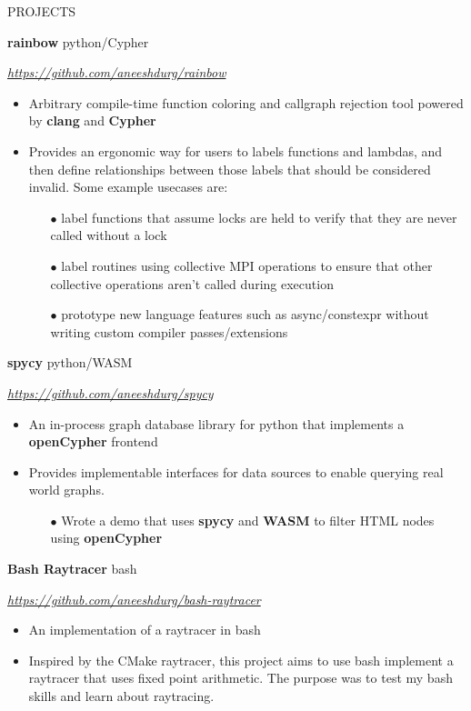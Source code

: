 \documentclass[paper=a4,fontsize=11pt]{scrartcl} %
\newcommand{\sepspace}{\vspace*{1em}}		%
\newcommand{\NewPart}[1]{ \noindent \large \usefont{OT1}{phv}{b}{n}\uppercase{#1} \normalfont \normalsize}
\newcommand{\EducationEntry}[4]{
		\noindent \textbf{#1}     %
			\hfill#2 \par  %
		\noindent \textit{#3} \par        %
		\noindent\hangafter=0 \small #4 %
		\normalsize \par}
\begin{document}
\sepspace
\NewPart{Projects}{}
\newline
\EducationEntry{rainbow}{python/Cypher}{\url{https://github.com/aneeshdurg/rainbow}}{
\begin{itemize}
  \item Arbitrary compile-time function coloring and callgraph rejection tool powered by \textbf{clang} and \textbf{Cypher}
\item Provides an ergonomic way for users to labels functions and lambdas, and then define relationships between those labels that should be considered invalid. Some example usecases are:
  \begin{itemize}
    \item[$\bullet$] label functions that assume locks are held to verify that they are never called without a lock
    \item[$\bullet$] label routines using collective MPI operations to ensure that other collective operations aren't called during execution
    \item[$\bullet$] prototype new language features such as async/constexpr without writing custom compiler passes/extensions
  \end{itemize}
\end{itemize}
}

\EducationEntry{spycy}{python/WASM}{\url{https://github.com/aneeshdurg/spycy}}{
\begin{itemize}
  \item An in-process graph database library for python that implements a \textbf{openCypher} frontend
  \item Provides implementable interfaces for data sources to enable querying real world graphs.
  \begin{itemize}
    \item[$\bullet$] Wrote a demo that uses \textbf{spycy} and \textbf{WASM} to filter HTML nodes using \textbf{openCypher}
  \end{itemize}
\end{itemize}
}

\EducationEntry{Bash Raytracer}{bash}{\url{https://github.com/aneeshdurg/bash-raytracer}}{
\begin{itemize}
\item An implementation of a raytracer in bash
\item Inspired by the CMake raytracer, this project aims to use bash implement a raytracer that uses fixed point arithmetic. The purpose was to test my bash skills and learn about raytracing.
\end{itemize}
}
\end{document}
